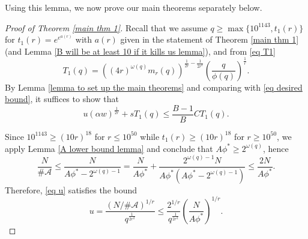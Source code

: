 \documentclass[12pt]{amsart}
\theoremstyle{plain}
\theoremstyle{definition}
\newcommand{\cA}{{\mathcal{A}}}
\begin{document}
Using this lemma, we now prove our main theorems separately below.
\begin{proof}[Proof of Theorem \ref{main thm 1}]
Recall that we assume $q\ge \max\{10^{1143}, t_1(r)\}$ for $t_1(r)=e^{e^{a(r)}}$ with $a(r)$ given in the statement of Theorem \ref{main thm 1} (and Lemma \ref{B will be at least 10 if it kills us lemma}), and from
\eqref{eq T1}
$$T_1(q) = \left((4r)^{\omega(q)}m_r(q)\right)^{\frac{1}{2r}-\frac{1}{2r^2}}\left(\frac{q}{\phi(q)}\right)^{\frac{1}{r}}.$$
By Lemma \ref{lemma to set up the main theorems}
and comparing with \eqref{eq desired bound}, it suffices to show that
\begin{equation*}
u(\alpha w)^{\frac{1}{2r}} + sT_1(q) \le \frac{B-1}{B} C T_1(q).
\end{equation*}

Since $10^{1143}\ge (10r)^{18}$ for $r\le 10^{50}$ while $t_1(r) \ge (10r)^{18}$ for $r\ge 10^{50}$, we apply Lemma \ref{A lower bound lemma} and conclude that $A\phi^{*} \ge 2^{\omega(q)}$, hence
$$\frac{N}{\#\mathcal{A}}\le \frac{N}{A\phi^*-2^{\omega(q)-1}}=\frac{N}{A\phi^*}+\frac{2^{\omega(q)-1}N}{A\phi^*(A\phi^*-2^{\omega(q)-1})} \le \frac{2N}{A\phi^{*}}.$$
Therefore, \eqref{eq u} satisfies the bound
\begin{equation} \label{roughly u}
u=\frac{\left(N/\#\cA\right)^{1/{r}}}{q^\frac{1}{2r^2}} \le \frac{2^{1/r}}{q^{\frac{1}{2r^2}}}\left(\frac{N}{A\phi^*}\right)^{1/r}.
\end{equation}


\end{proof}
\end{document}
